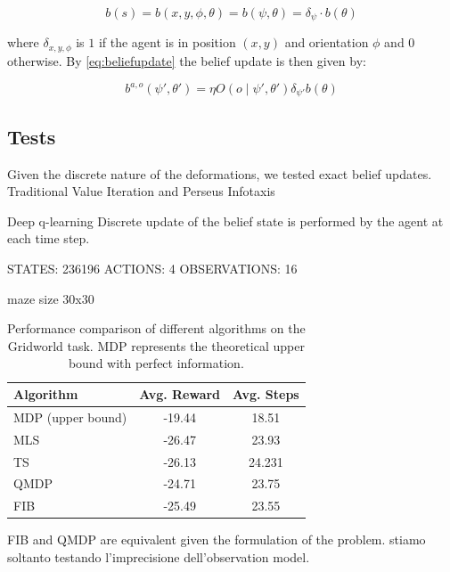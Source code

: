 $$b(s) = b(x,y,\phi,\theta) = b(\psi, \theta) = \delta_{\psi} \cdot b(\theta)$$

where $\delta_{x,y,\phi}$ is $1$ if the agent is in position $(x,y)$ and orientation $\phi$ and $0$ otherwise.
By \cref{eq:beliefupdate} the belief update is then given by:

\begin{equation}
    \label{eq:beliefupdategridworld}
    b^{a,o}(\psi',\theta') = \eta O(o\mid \psi',\theta') \delta_{\psi'}b(\theta) 
\end{equation}



\subsection{Tests}

Given the discrete nature of the deformations, we tested exact belief updates.
Traditional Value Iteration and Perseus Infotaxis

Deep q-learning 
Discrete update of the belief state is performed by the agent at each time step.


STATES: 236196
ACTIONS: 4
OBSERVATIONS: 16

maze size 30x30

\begin{table}[h]
\centering
\begin{tabular}{lcc}
\toprule
\textbf{Algorithm} & \textbf{Avg. Reward} & \textbf{Avg. Steps} \\
\midrule
MDP (upper bound) & -19.44 & 18.51\\
MLS & -26.47 & 23.93\\
TS &-26.13 & 24.231\\
QMDP & -24.71 & 23.75 \\
FIB & -25.49 & 23.55 \\
\bottomrule
\end{tabular}
\caption{Performance comparison of different algorithms on the Gridworld task. MDP represents the theoretical upper bound with perfect information.}
\label{tab:gridworld_results}
\end{table}

FIB and QMDP are equivalent given the formulation of the problem. stiamo soltanto 
testando l'imprecisione dell'observation model.


